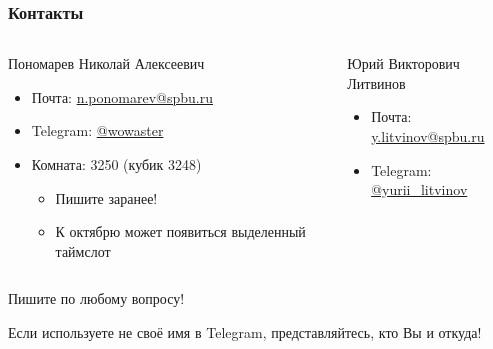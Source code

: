 \documentclass[aspectratio=169]{beamer}
\begin{document}
\begin{frame}
    \frametitle{Контакты}

    \begin{columns}[t]
        \begin{column}{0.45\linewidth}
            Пономарев Николай Алексеевич
            \begin{itemize}
                \item Почта: \href{mailto:n.ponomarev@spbu.ru}{n.ponomarev@spbu.ru}
                \item Telegram: \href{https://t.me/wowaster}{@wowaster}
                \item Комната: 3250 (кубик 3248)
                      \begin{itemize}
                          \item Пишите заранее!
                          \item К октябрю может появиться выделенный таймслот
                      \end{itemize}
            \end{itemize}
        \end{column}
        \begin{column}{0.45\linewidth}
            Юрий Викторович Литвинов
            \begin{itemize}
                \item Почта: \href{mailto:y.litvinov@spbu.ru}{y.litvinov@spbu.ru}
                \item Telegram: \href{https://t.me/yurii\_litvinov}{@yurii\_litvinov}
            \end{itemize}
        \end{column}
    \end{columns}

    \begin{center}
        \Large
        \alert{Пишите по любому вопросу!}
    \end{center}

    Если используете не своё имя в Telegram, представляйтесь, кто Вы и откуда!
\end{frame}
\end{document}
